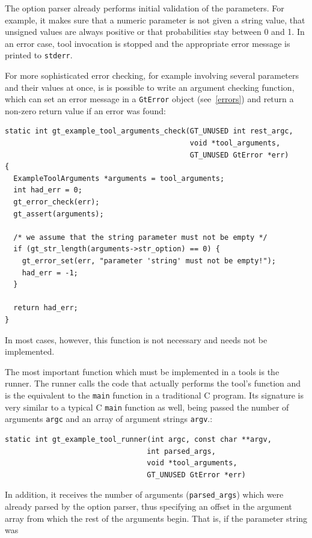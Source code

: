 \documentclass[11pt,final]{article}
\newcommand{\keyword}[1]{\lstinline{#1}}
\begin{document}
The option parser already performs initial validation of the parameters. For
example, it makes sure that a numeric parameter is not given a string value,
that unsigned values are always positive or that probabilities stay between 0
and 1.
In an error case, tool invocation is stopped and the appropriate error message
is printed to \keyword{stderr}.

For more sophisticated error checking, for example involving several parameters
and their values at once, is is possible to write an argument checking function,
which can set an error message in a \keyword{GtError} object (see~\ref{errors})
and return a non-zero return value if an error was found:

\begin{lstlisting}
static int gt_example_tool_arguments_check(GT_UNUSED int rest_argc,
                                           void *tool_arguments,
                                           GT_UNUSED GtError *err)
{
  ExampleToolArguments *arguments = tool_arguments;
  int had_err = 0;
  gt_error_check(err);
  gt_assert(arguments);

  /* we assume that the string parameter must not be empty */
  if (gt_str_length(arguments->str_option) == 0) {
    gt_error_set(err, "parameter 'string' must not be empty!");
    had_err = -1;
  }

  return had_err;
}
\end{lstlisting}

In most cases, however, this function is not necessary and needs not be
implemented.

The most important function which must be implemented in a tools is the runner.
The runner calls the code that actually performs the tool's function and is the
equivalent to the \keyword{main} function in a traditional C program.
Its signature is very similar to a typical C \keyword{main} function as well,
being passed the number of arguments \keyword{argc} and an array of argument
strings \keyword{argv}.:

\begin{lstlisting}
static int gt_example_tool_runner(int argc, const char **argv,
                                 int parsed_args,
                                 void *tool_arguments,
                                 GT_UNUSED GtError *err)
\end{lstlisting}

In addition, it receives the number of arguments (\keyword{parsed_args}) which
were already parsed by the option parser, thus specifying an offset in the
argument array from which the rest of the arguments begin.
That is, if the parameter string was
\end{document}
